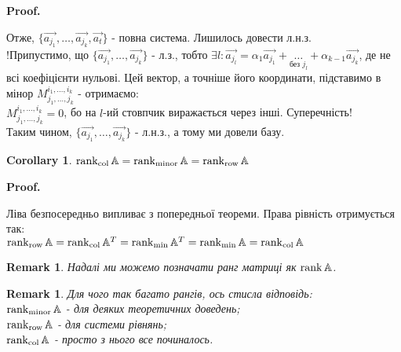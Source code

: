 \documentclass[a4paper, 10pt]{article}
\makeatletter
\def\qed{$\blacksquare$}
\theoremstyle{theoremdd}
\theoremstyle{theoremdd}
\theoremstyle{theoremdd}
\theoremstyle{theoremdd}
\theoremstyle{theoremdd}
\theoremstyle{theoremdd}
\newtheorem{remark}[theorem]{Remark}
\theoremstyle{theoremdd}
\theoremstyle{theoremdd}
\newtheorem{corollary}[theorem]{Corollary}
\renewenvironment{proof}[1][Proof.\\]{\par
\pushQED{\hfill \qed}%
\normalfont \topsep6\p@\@plus6\p@\relax
\trivlist
\item\relax
{\bfseries
#1\@addpunct{.}}\hspace\labelsep\ignorespaces
}{%
\popQED\endtrivlist\@endpefalse
}
\makeatother
\begin{document}
\begin{proof}
Отже, $\{\vec{a_{j_1}},\dots,\vec{a_{j_k}}, \vec{a_t}\}$ - повна система. Лишилось довести л.н.з.\\
!Припустимо, що $\{\vec{a_{j_1}},\dots,\vec{a_{j_k}}\}$ - л.з., тобто $\exists l: \vec{a_{j_l}} = \alpha_1 \vec{a_{j_1}} + \underset{\text{без }j_l}{\dots} + \alpha_{k-1} \vec{a_{j_k}}$, де не всі коефіцієнти нульові. Цей вектор, а точніше його координати, підставимо в мінор $M_{j_1,\dots,j_k}^{i_1,\dots,i_k}$ - отримаємо:\\
$M_{j_1,\dots,j_k}^{i_1,\dots,i_k} = 0$, бо на $l$-ий стовпчик виражається через інші. Суперечність!\\
Таким чином, $\{\vec{a_{j_1}},\dots,\vec{a_{j_k}}\}$ - л.н.з., а тому ми довели базу.
\end{proof}

\begin{corollary}
$\rank_{\textrm{col}} \mathbb{A} = \rank_{\textrm{minor}} \mathbb{A} = \rank_{\textrm{row}} \mathbb{A}$
\end{corollary}

\begin{proof}
Ліва безпосередньо випливає з попередньої теореми. Права рівність отримується так:\\
$\rank_{\textrm{row}} \mathbb{A} = \rank_{\textrm{col}} \mathbb{A}^T = \rank_{\textrm{min}} \mathbb{A}^T = \rank_{\textrm{min}} \mathbb{A} = \rank_{\textrm{col}} \mathbb{A}$
\end{proof}

\begin{remark}
Надалі ми можемо позначати ранг матриці як $\rank \mathbb{A}$.
\end{remark}

\begin{remark}
Для чого так багато рангів, ось стисла відповідь:\\
$\rank_{\textrm{minor}} \mathbb{A}$ - для деяких теоретичних доведень;\\
$\rank_{\textrm{row}} \mathbb{A}$ - для системи рівнянь;\\
$\rank_{\textrm{col}} \mathbb{A}$ - просто з нього все починалось.
\end{remark}
\end{document}
